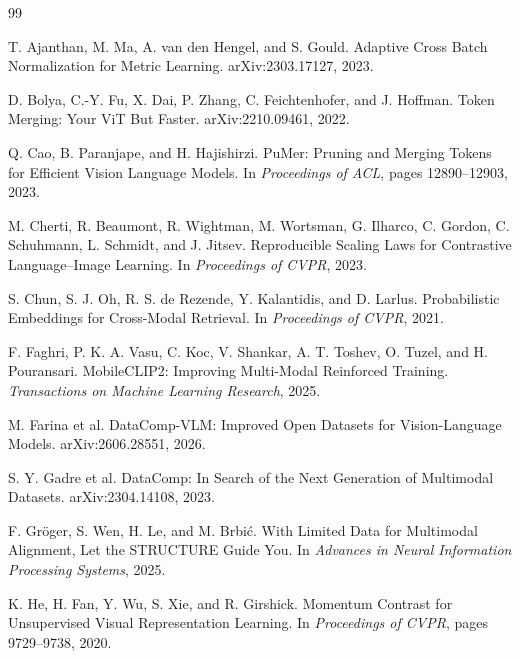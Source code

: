 \documentclass[11pt,a4paper]{article}
\begin{document}
\begin{thebibliography}{99}

T. Ajanthan, M. Ma, A. van den Hengel, and S. Gould.
\newblock Adaptive Cross Batch Normalization for Metric Learning.
\newblock arXiv:2303.17127, 2023.

D. Bolya, C.-Y. Fu, X. Dai, P. Zhang, C. Feichtenhofer, and J. Hoffman.
\newblock Token Merging: Your ViT But Faster.
\newblock arXiv:2210.09461, 2022.

Q. Cao, B. Paranjape, and H. Hajishirzi.
\newblock PuMer: Pruning and Merging Tokens for Efficient Vision Language Models.
\newblock In \emph{Proceedings of ACL}, pages 12890--12903, 2023.

M. Cherti, R. Beaumont, R. Wightman, M. Wortsman, G. Ilharco, C. Gordon,
C. Schuhmann, L. Schmidt, and J. Jitsev.
\newblock Reproducible Scaling Laws for Contrastive Language--Image Learning.
\newblock In \emph{Proceedings of CVPR}, 2023.

S. Chun, S. J. Oh, R. S. de Rezende, Y. Kalantidis, and D. Larlus.
\newblock Probabilistic Embeddings for Cross-Modal Retrieval.
\newblock In \emph{Proceedings of CVPR}, 2021.

F. Faghri, P. K. A. Vasu, C. Koc, V. Shankar, A. T. Toshev, O. Tuzel, and
H. Pouransari.
\newblock MobileCLIP2: Improving Multi-Modal Reinforced Training.
\newblock \emph{Transactions on Machine Learning Research}, 2025.

M. Farina et al.
\newblock DataComp-VLM: Improved Open Datasets for Vision-Language Models.
\newblock arXiv:2606.28551, 2026.

S. Y. Gadre et al.
\newblock DataComp: In Search of the Next Generation of Multimodal Datasets.
\newblock arXiv:2304.14108, 2023.

F. Gr\"oger, S. Wen, H. Le, and M. Brbi\'c.
\newblock With Limited Data for Multimodal Alignment, Let the STRUCTURE Guide You.
\newblock In \emph{Advances in Neural Information Processing Systems}, 2025.

K. He, H. Fan, Y. Wu, S. Xie, and R. Girshick.
\newblock Momentum Contrast for Unsupervised Visual Representation Learning.
\newblock In \emph{Proceedings of CVPR}, pages 9729--9738, 2020.


\end{thebibliography}
\end{document}
